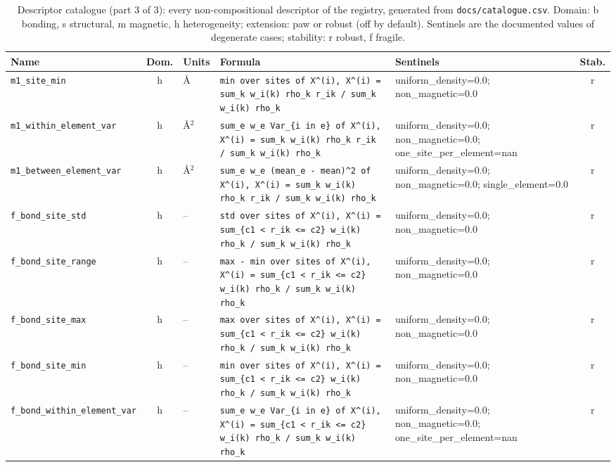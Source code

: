 \begin{table}[p]
\centering
\caption{Descriptor catalogue (part 3 of 3): every non-compositional descriptor of the registry, generated from \texttt{docs/catalogue.csv}. Domain: b bonding, s structural, m magnetic, h heterogeneity; extension: paw or robust (off by default). Sentinels are the documented values of degenerate cases; stability: r robust, f fragile.}
\scriptsize
\begin{tabular}{p{3.3cm}cp{1.4cm}p{6.6cm}p{2.3cm}c}
\toprule
Name & Dom. & Units & Formula & Sentinels & Stab. \\
\midrule
\texttt{m1\_site\_min} & h & \AA & \texttt{min over sites of X\^{}(i),  X\^{}(i) = sum\_k w\_i(k) rho\_k r\_ik / sum\_k w\_i(k) rho\_k} & uniform\_density=0.0; non\_magnetic=0.0 & r \\
\texttt{m1\_within\_element\_var} & h & \AA$^2$ & \texttt{sum\_e w\_e Var\_\{i in e\} of X\^{}(i),  X\^{}(i) = sum\_k w\_i(k) rho\_k r\_ik / sum\_k w\_i(k) rho\_k} & uniform\_density=0.0; non\_magnetic=0.0; one\_site\_per\_element=nan & r \\
\texttt{m1\_between\_element\_var} & h & \AA$^2$ & \texttt{sum\_e w\_e (mean\_e - mean)\^{}2 of X\^{}(i),  X\^{}(i) = sum\_k w\_i(k) rho\_k r\_ik / sum\_k w\_i(k) rho\_k} & uniform\_density=0.0; non\_magnetic=0.0; single\_element=0.0 & r \\
\texttt{f\_bond\_site\_std} & h & -- & \texttt{std over sites of X\^{}(i),  X\^{}(i) = sum\_\{c1 < r\_ik <= c2\} w\_i(k) rho\_k / sum\_k w\_i(k) rho\_k} & uniform\_density=0.0; non\_magnetic=0.0 & r \\
\texttt{f\_bond\_site\_range} & h & -- & \texttt{max - min over sites of X\^{}(i),  X\^{}(i) = sum\_\{c1 < r\_ik <= c2\} w\_i(k) rho\_k / sum\_k w\_i(k) rho\_k} & uniform\_density=0.0; non\_magnetic=0.0 & r \\
\texttt{f\_bond\_site\_max} & h & -- & \texttt{max over sites of X\^{}(i),  X\^{}(i) = sum\_\{c1 < r\_ik <= c2\} w\_i(k) rho\_k / sum\_k w\_i(k) rho\_k} & uniform\_density=0.0; non\_magnetic=0.0 & r \\
\texttt{f\_bond\_site\_min} & h & -- & \texttt{min over sites of X\^{}(i),  X\^{}(i) = sum\_\{c1 < r\_ik <= c2\} w\_i(k) rho\_k / sum\_k w\_i(k) rho\_k} & uniform\_density=0.0; non\_magnetic=0.0 & r \\
\texttt{f\_bond\_within\_element\_var} & h & -- & \texttt{sum\_e w\_e Var\_\{i in e\} of X\^{}(i),  X\^{}(i) = sum\_\{c1 < r\_ik <= c2\} w\_i(k) rho\_k / sum\_k w\_i(k) rho\_k} & uniform\_density=0.0; non\_magnetic=0.0; one\_site\_per\_element=nan & r \\

\end{tabular}
\end{table}
